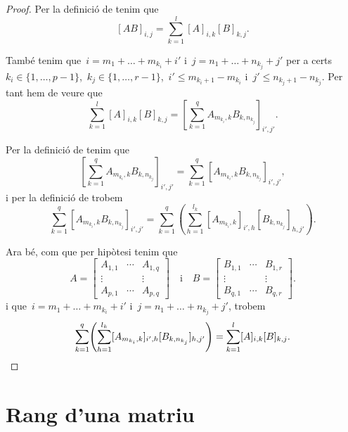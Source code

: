 \documentclass[../../main.tex]{subfiles}
\begin{document}
    \begin{proof}
        Per la definició de  tenim que
        \[
            [AB]_{i,j}=\sum_{k=1}^{l}[A]_{i,k}[B]_{k,j}.
        \]

        També tenim que~\(i=m_{1}+\dots+m_{k_{i}}+i'\) i~\(j=n_{1}+\dots+n_{k_{j}}+j'\) per a certs~\(k_{i}\in\{1,\dots,p-1\}\),~\(k_{j}\in\{1,\dots,r-1\}\),~\(i'\leq m_{k_{i}+1}-m_{k_{i}}\) i~\(j'\leq n_{k_{j}+1}-n_{k_{j}}\).
        Per tant hem de veure que
        \[
            \sum_{k=1}^{l}[A]_{i,k}[B]_{k,j}=\left[\sum_{k=1}^{q}A_{m_{k_{i}},k}B_{k,n_{k_{j}}}\right]_{i',j'}.
        \]

        Per la definició de  tenim que
        \[
            \left[\sum_{k=1}^{q}A_{m_{k_{i}},k}B_{k,n_{k_{j}}}\right]_{i',j'}=\sum_{k=1}^{q}[A_{m_{k_{i}},k}B_{k,n_{k_{j}}}]_{i',j'},
        \]
        i per la definició de  trobem
        \[
            \sum_{k=1}^{q}[A_{m_{k_{i}},k}B_{k,n_{k_{j}}}]_{i',j'}=\sum_{k=1}^{q}\left(\sum_{h=1}^{l_{k}}[A_{m_{k_{i}},k}]_{i',h}[B_{k,n_{k_{j}}}]_{h,j'}\right).
        \]

        Ara bé, com que per hipòtesi tenim que
        \[A=\left[\begin{matrix}
        A_{1,1} & \cdots & A_{1,q} \\
        \vdots & & \vdots \\
        A_{p,1} & \cdots & A_{p,q}
        \end{matrix}\right]\quad\text{i}\quad B=\left[\begin{matrix}
        B_{1,1} & \cdots & B_{1,r} \\
        \vdots & & \vdots \\
        B_{q,1} & \cdots & B_{q,r}
        \end{matrix}\right].\]
        i que~\(i=m_{1}+\dots+m_{k_{i}}+i'\) i~\(j=n_{1}+\dots+n_{k_{j}}+j'\), trobem
        \[
            \sum_{k=1}^{q}\left(\sum_{h=1}^{l_{k}}[A_{m_{k_{i}},k}]_{i',h}[B_{k,n_{k_{j}}}]_{h,j'}\right)=\sum_{k=1}^{l}[A]_{i,k}[B]_{k,j}.\qedhere
        \]
    \end{proof}
\section{Rang d'una matriu}
\end{document}
